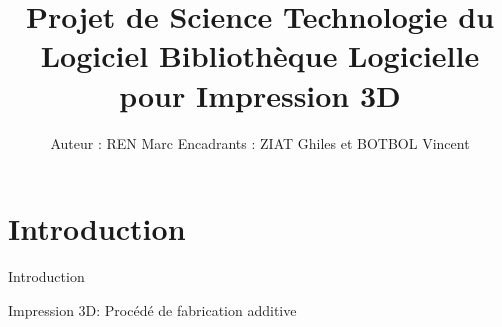 \documentclass[11pt, titlepage]{article}
\title[Presentation]{Projet de Science Technologie du Logiciel
Bibliothèque Logicielle pour Impression 3D}
\author{Auteur : REN Marc\newline
Encadrants : ZIAT Ghiles et BOTBOL Vincent}
\institute{Université Pierre et Marie Curie}
\begin{document}
\begin{frame}
  \titlepage
\end{frame}

\section{Introduction}
\begin{frame}{Introduction}
	\begin{description}
    	\item Impression 3D:
    	Procédé de fabrication additive
    \end{description}
\end{frame}
\end{document}

